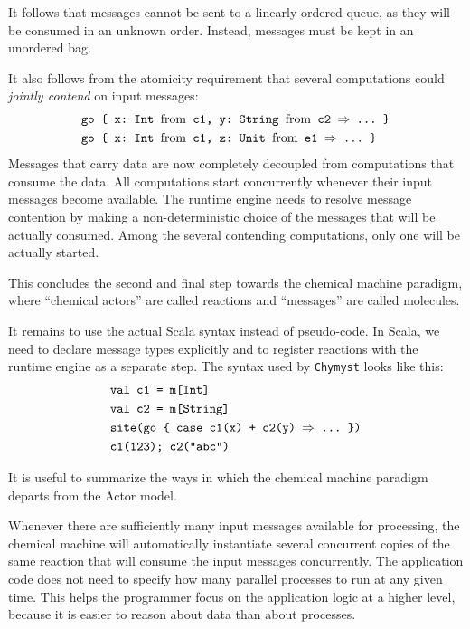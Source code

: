 \documentclass[sigplan,10pt]{acmart}\settopmatter{}
\begin{document}
It follows that messages cannot be sent to a linearly ordered queue,
as they will be consumed in an unknown order.
Instead, messages must be kept in an unordered bag.

It also follows from the atomicity requirement that
several computations could \emph{jointly contend} on input messages:
\begin{align*}
\text{} & \text{\texttt{go \{ x:~Int \textnormal{from} c1, y:~String \textnormal{from} c2 \ensuremath{\Rightarrow} ...~\}}}\\
 & \text{\texttt{go \{ x:~Int \textnormal{from} c1, z:~Unit \textnormal{from} e1 \ensuremath{\Rightarrow} ...~\}}}
\end{align*}
Messages that carry data are now completely decoupled from computations
that consume the data. All computations start concurrently whenever
their input messages become available. The runtime engine needs to
resolve message contention by making a non-deterministic choice of
the messages that will be actually consumed. Among the several contending
computations, only one will be actually started.

This concludes the second and final step towards the chemical machine
paradigm, where ``chemical actors'' are called reactions and ``messages'' are called molecules.

It remains to use the actual Scala syntax instead of pseudo-code.
In Scala, we need to declare message types explicitly and to register
reactions with the runtime engine as a separate step.
The syntax used by \texttt{Chymyst} looks like this:
\begin{align*}
\text{} & \text{\texttt{val c1 = m[Int]}}\\
 & \text{\texttt{val c2 = m[String]}}\\
 & \text{\texttt{site(go \{ case c1(x) + c2(y) \ensuremath{\Rightarrow} ...~\})}}\\
 & \text{\texttt{c1(123); }\texttt{c2("abc")}}
\end{align*}

It is useful to summarize the ways in which the chemical machine paradigm departs
from the Actor model.

Whenever there are sufficiently many input messages available for
processing, the chemical machine will automatically instantiate several
concurrent copies of the same reaction that will consume the input
messages concurrently. The application code
does not need to specify how many parallel processes to run at any
given time.
This helps the programmer focus on the application logic at a higher level,
because it is easier to reason about data than about processes.
\end{document}
